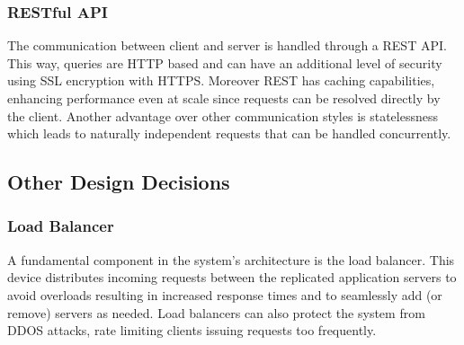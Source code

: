 \subsubsection{RESTful API}
The communication between client and server is handled through a REST API. This way, queries are HTTP based and can have an additional level of security using SSL encryption with HTTPS. Moreover REST has caching capabilities, enhancing performance even at scale since requests can be resolved directly by the client. Another advantage over other communication styles is statelessness which leads to naturally independent requests that can be handled concurrently.
\subsection{Other Design Decisions}
\subsubsection{Load Balancer}
A fundamental component in the system’s architecture is the load balancer. This device distributes incoming requests between the replicated application servers to avoid overloads resulting in increased response times and to seamlessly add (or remove) servers as needed. Load balancers can also protect the system from DDOS attacks, rate limiting clients issuing requests too frequently.